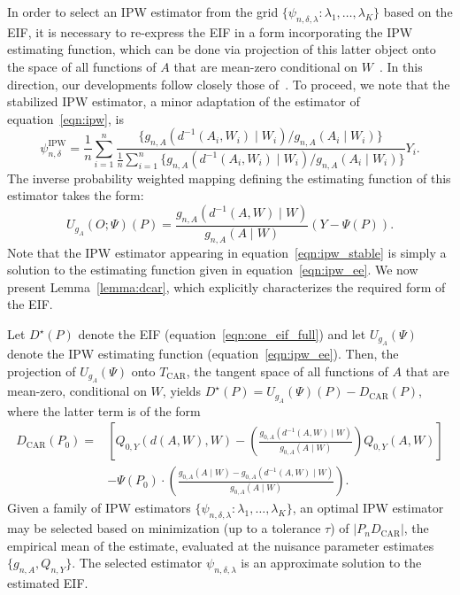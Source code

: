 In order to select an IPW estimator from the grid $\{\psi_{n,\delta,\lambda}:
\lambda_1, \ldots, \lambda_K \}$ based on the EIF, it is necessary to re-express
the EIF in a form incorporating the IPW estimating function, which can be done
via projection of this latter object onto the space of all functions of $A$ that
are mean-zero conditional on $W$~\citep{robins1994estimation,vdl2003unified}.
In this direction, our developments follow closely those
of~\citet{ertefaie2020nonparametric}. To proceed, we note that the stabilized
IPW estimator, a minor adaptation of the estimator of equation~\eqref{eqn:ipw},
is
\begin{equation}\label{eqn:ipw_stable}
  \psi_{n,\delta}^{\text{IPW}} = \frac{1}{n} \sum_{i=1}^n
  \frac{\{g_{n, A}(d^{-1}(A_i, W_i) \mid W_i) / g_{n, A}(A_i \mid W_i)\}}{
  \frac{1}{n} \sum_{i=1}^n\{g_{n, A}(d^{-1}(A_i, W_i) \mid W_i) /
  g_{n, A}(A_i \mid W_i)\}} Y_i .
\end{equation}
The inverse probability weighted mapping defining the estimating function of
this estimator takes the form:
\begin{equation}\label{eqn:ipw_ee}
  U_{g_A}(O; \Psi)(P) = \frac{g_{n, A}(d^{-1}(A, W) \mid W)}
    {g_{n, A}(A \mid W)}(Y - \Psi(P)).
\end{equation}
Note that the IPW estimator appearing in equation~\eqref{eqn:ipw_stable} is
simply a solution to the estimating function given in
equation~\eqref{eqn:ipw_ee}. We now present Lemma~\ref{lemma:dcar}, which
explicitly characterizes the required form of the EIF.
\begin{lemma}\label{lemma:dcar}
  Let $D^{\star}(P)$ denote the EIF (equation~\eqref{eqn:one_eif_full}) and let
  $U_{g_A}(\Psi)$ denote the IPW estimating function
  (equation~\eqref{eqn:ipw_ee}). Then, the projection of $U_{g_A}(\Psi)$ onto
  $T_{\text{CAR}}$, the tangent space of all functions of $A$ that are
  mean-zero, conditional on $W$, yields $D^{\star}(P) = U_{g_A}(\Psi)(P)
  - D_{\text{CAR}}(P)$, where the latter term is of the form
  \begin{align*}
    D_{\text{CAR}}(P_0) =& \left[Q_{0,Y}(d(A,W),W) -
    \left(\frac{g_{0,A}(d^{-1}(A,W) \mid W)}{g_{0,A}(A \mid W)}\right)
    Q_{0,Y}(A,W)\right]\\ &- \Psi(P_0) \cdot \left(\frac{g_{0,A}(A \mid W) -
    g_{0,A}(d^{-1}(A,W) \mid W)}{g_{0,A}(A \mid W)}\right) .
  \end{align*}
  Given a family of IPW estimators $\{\psi_{n,\delta,\lambda}: \lambda_1,
  \ldots, \lambda_K\}$, an optimal IPW estimator may be selected based on
  minimization (up to a tolerance $\tau$) of $\lvert P_n D_{\text{CAR}} \rvert$,
  the empirical mean of the estimate, evaluated at the nuisance parameter
  estimates $\{g_{n,A}, Q_{n,Y}\}$. The selected estimator
  $\psi_{n,\delta,\lambda}$ is an approximate solution to the estimated EIF.
\end{lemma}
